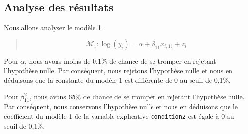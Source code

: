 \documentclass[
  11pt,
  french,
]{article}
\begin{document}
\newpage

\hypertarget{analyse-des-ruxe9sultats-4}{%
\subsection{Analyse des résultats}\label{analyse-des-ruxe9sultats-4}}

\begin{table}[!h]

\caption{\label{tab:unnamed-chunk-37}Comparaison des performances des régressions linéaires de l'analyse 4}
\centering
{}
\end{table}

Nous allons analyser le modèle 1.

\begin{quote}
\[\mathcal{M}_{1}:\log(y_{i})=\alpha+\beta_{11}x_{i,11}+z_{i}\]
\end{quote}

Pour \(\alpha\), nous avons moins de 0,1\% de chance de se tromper en
rejetant l'hypothèse nulle. Par conséquent, nous rejetons l'hypothèse
nulle et nous en déduisons que la constante du modèle 1 est différente
de 0 au seuil de 0,1\%.

Pour \(\beta_{11}^{2}\), nous avons 65\% de chance de se tromper en
rejetant l'hypothèse nulle. Par conséquent, nous conservons l'hypothèse
nulle et nous en déduisons que le coefficient du modèle 1 de la variable
explicative \texttt{condition2} est égale à 0 au seuil de 0,1\%.
\end{document}
